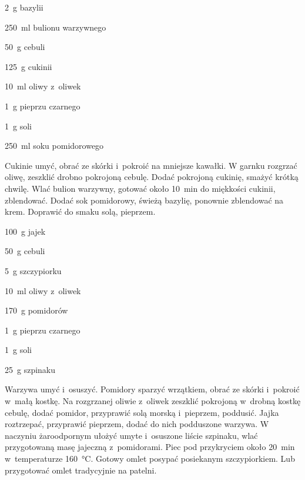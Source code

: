 \documentclass[../main.tex]{subfiles}
\begin{document}

\begin{Ingred}
    \item \qty{2}{\gram} bazylii
    \item \qty{250}{\milli\litre} bulionu warzywnego
    \item \qty{50}{\gram} cebuli
    \item \qty{125}{\gram} cukinii
    \item \qty{10}{\milli\litre} oliwy z~oliwek
    \item \qty{1}{\gram} pieprzu czarnego
    \item \qty{1}{\gram} soli
    \item \qty{250}{\milli\litre} soku pomidorowego
\end{Ingred}

Cukinie umyć, obrać ze skórki i~pokroić na mniejsze kawałki. W garnku rozgrzać
oliwę, zeszklić drobno pokrojoną cebulę. Dodać pokrojoną cukinię, smażyć krótką
chwilę. Wlać bulion warzywny, gotować około \qty{10}{\minute} do miękkości
cukinii, zblendować. Dodać sok pomidorowy, świeżą bazylię, ponownie zblendować
na krem. Doprawić do smaku solą, pieprzem.


\begin{Ingred}
    \item \qty{100}{\gram} jajek
    \item \qty{50}{\gram} cebuli
    \item \qty{5}{\gram} szczypiorku
    \item \qty{10}{\milli\litre} oliwy z~oliwek
    \item \qty{170}{\gram} pomidorów
    \item \qty{1}{\gram} pieprzu czarnego
    \item \qty{1}{\gram} soli
    \item \qty{25}{\gram} szpinaku
\end{Ingred}

Warzywa umyć i~osuszyć. Pomidory sparzyć wrzątkiem, obrać ze skórki i~pokroić
w~małą kostkę. Na rozgrzanej oliwie z~oliwek zeszklić pokrojoną w~drobną kostkę
cebulę, dodać pomidor, przyprawić solą morską i~pieprzem, poddusić. Jajka
roztrzepać, przyprawić pieprzem, dodać do nich podduszone warzywa. W naczyniu
żaroodpornym ułożyć umyte i~osuszone liście szpinaku, wlać przygotowaną masę
jajeczną z~pomidorami. Piec pod przykryciem około \qty{20}{\minute}
w~temperaturze \qty{160}{\celsius}. Gotowy omlet posypać posiekanym
szczypiorkiem. Lub przygotować omlet tradycyjnie na patelni.
\end{document}
